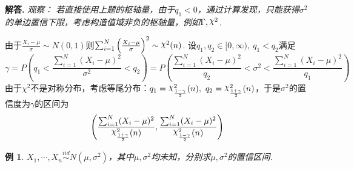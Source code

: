 \documentclass[12pt, a4paper, oneside]{ctexart}
\newtheorem{example}{例}[section]  %
\numberwithin{equation}{section}  %
\newenvironment{solution}[1][]{\par\noindent\textbf{#1解答. }}{\smallskip\par}  %
\newenvironment{watch}{\it 观察：}{}
\DeclareRobustCommand{\rchi}{{\mathpalette\irchi\relax}}
\newcommand{\irchi}[2]{\raisebox{\depth}{$#1\chi$}} %
\def\add{\vspace{1ex}}      %
\begin{document}
\begin{solution}
    \begin{watch}
        若直接使用上题的枢轴量，由于$q_1<0$，通过计算发现，只能获得$\sigma^2$的单边置信下限，考虑构造值域非负的枢轴量，例如$\Gamma,\rchi^2$.\add
    \end{watch}

    由于$\frac{X_i-\mu}{\sigma}\sim  N(0,1)$则$\sum_{i=1}^N\left(\frac{X_i-\mu}{\sigma}\right)^2\sim\rchi^2(n)$. 设$q_1,q_2\in[0,\infty),\ q_1 < q_2$满足
    \begin{equation*}
        \gamma = P\left(q_1<\frac{\sum_{i=1}^N(X_i-\mu)^2}{\sigma^2}<q_2\right) = P\left(\frac{\sum_{i=1}^N(X_i-\mu)^2}{q_2}<\sigma^2<\frac{\sum_{i=1}^N(X_i-\mu)^2}{q_1}\right)
    \end{equation*}
    由于$\chi^2$不是对称分布，考虑等尾分布：$q_1=\rchi^2_{\frac{1-\gamma}{2}}(n),\ q_2=\rchi^2_{\frac{1+\gamma}{2}}(n)$，于是$\sigma^2$的置信度为$\gamma$的区间为
    \begin{equation*}
        \left(\frac{\sum_{i=1}^N(X_i-\mu)^2}{\rchi^2_{\frac{1+\gamma}{2}}(n)},\frac{\sum_{i=1}^N(X_i-\mu)^2}{\rchi^2_{\frac{1-\gamma}{2}}(n)}\right)
    \end{equation*}
\end{solution}
\begin{example}\label{example-都未知}
    $X_1,\cdots,X_n\overset{iid}{\sim}N(\mu,\sigma^2)$，其中$\mu,\sigma^2$均未知，分别求$\mu,\sigma^2$的置信区间.
\end{example}
\end{document}
